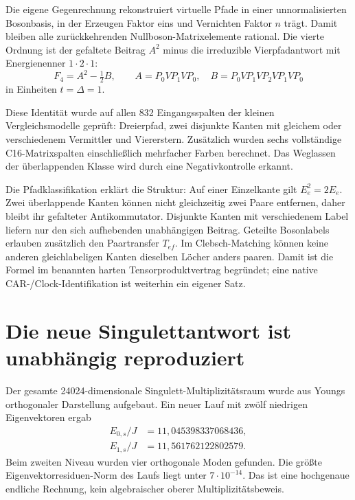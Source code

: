 Die eigene Gegenrechnung rekonstruiert virtuelle Pfade in einer unnormalisierten Bosonbasis, in der Erzeugen Faktor eins und Vernichten Faktor $n$ trägt. Damit bleiben alle zurückkehrenden Nullboson-Matrixelemente rational. Die vierte Ordnung ist der gefaltete Beitrag $A^2$ minus die irreduzible Vierpfadantwort mit Energienenner $1\cdot2\cdot1$:
\begin{equation}
F_4=A^2-\tfrac12 B,\qquad
A=P_0VP_1VP_0,\quad B=P_0VP_1VP_2VP_1VP_0
\end{equation}
in Einheiten $t=\Delta=1$.

Diese Identität wurde auf allen 832 Eingangsspalten der kleinen Vergleichsmodelle geprüft: Dreierpfad, zwei disjunkte Kanten mit gleichem oder verschiedenem Vermittler und Viererstern. Zusätzlich wurden sechs vollständige C16-Matrixspalten einschließlich mehrfacher Farben berechnet. Das Weglassen der überlappenden Klasse wird durch eine Negativkontrolle erkannt.

Die Pfadklassifikation erklärt die Struktur: Auf einer Einzelkante gilt $E_e^2=2E_e$. Zwei überlappende Kanten können nicht gleichzeitig zwei Paare entfernen, daher bleibt ihr gefalteter Antikommutator. Disjunkte Kanten mit verschiedenem Label liefern nur den sich aufhebenden unabhängigen Beitrag. Geteilte Bosonlabels erlauben zusätzlich den Paartransfer $T_{ef}$. Im Clebsch-Matching können keine anderen gleichlabeligen Kanten dieselben Löcher anders paaren. Damit ist die Formel im benannten harten Tensorproduktvertrag begründet; eine native CAR-/Clock-Identifikation ist weiterhin ein eigener Satz.

\section{Die neue Singulettantwort ist unabhängig reproduziert}
Der gesamte 24024-dimensionale Singulett-Multiplizitätsraum wurde aus Youngs orthogonaler Darstellung aufgebaut. Ein neuer Lauf mit zwölf niedrigen Eigenvektoren ergab
\begin{align}
E_{0,s}/J&=11{,}045398337068436,\\
E_{1,s}/J&=11{,}561762122802579.
\end{align}
Beim zweiten Niveau wurden vier orthogonale Moden gefunden. Die größte Eigenvektorresiduen-Norm des Laufs liegt unter $7\cdot10^{-14}$. Das ist eine hochgenaue endliche Rechnung, kein algebraischer oberer Multiplizitätsbeweis.

